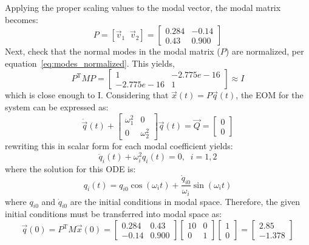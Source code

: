 \documentclass[12pt,letter]{article}
\begin{document}
\begin{example}
	Applying the proper scaling values to the modal vector, the modal matrix becomes:
	\begin{equation}
	P = [ \vec{v}_1 \; \; \vec{v}_2 ] = \begin{bmatrix} 0.284 & -0.14 \\    0.43  & 0.900 \end{bmatrix}
	\end{equation}
	Next, check that the normal modes in the modal matrix ($P$) are normalized, per equation~\ref{eq:modes_normalized}. This yields,
	\begin{equation}
	P^{\text{T}} M P = \begin{bmatrix} 1 & -2.775e-16 \\   -2.775e-16 & 1 \end{bmatrix} \approx I
	\end{equation}
	which is close enough to I. Considering that $\vec{x}(t) = P\vec{q}(t)$, the EOM for the system can be expressed as:
	\begin{equation}
	\ddot{\vec{q}}(t) + \begin{bmatrix} \omega_1^2 & 0 \\    0  & \omega_2^2 \end{bmatrix} \vec{q} (t) = \vec{Q} = \begin{bmatrix} 0 \\  0  \end{bmatrix} 
	\end{equation}
	rewriting this in scalar form for each modal coefficient yields:
	\begin{equation}
	\ddot{q}_i(t) + \omega_i^2 q_i (t) = 0, \; \; i=1,2
	\end{equation}
	where the solution for this ODE is:
	\begin{equation}
	q_i(t) = q_{i0} \cos(\omega_i t) +  \frac{\dot{q}_{i0}}{\omega_i} \sin( \omega_i t)
	\end{equation}
	where $q_{i0}$ and $\dot{q}_{i0}$ are the initial conditions in modal space. Therefore, the given initial conditions must be transferred into modal space as:
	\begin{equation}
	\vec{q}(0) = P^\text{T} M \vec{x}(0) = \begin{bmatrix} 0.284 &  0.43 \\  -0.14    & 0.900 \end{bmatrix} \begin{bmatrix} 10 & 0 \\  0  & 1 \end{bmatrix}  \begin{bmatrix} 1 \\  0 \end{bmatrix} =  \begin{bmatrix}  2.85 \\  -1.378 \end{bmatrix}

\end{equation}
\end{example}
\end{document}
